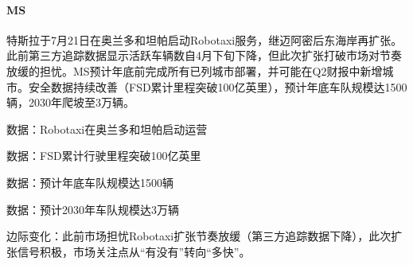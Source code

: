 \documentclass[11pt]{ctexart}
\begin{document}
\paragraph{MS} 特斯拉于7月21日在奥兰多和坦帕启动Robotaxi服务，继迈阿密后东海岸再扩张。此前第三方追踪数据显示活跃车辆数自4月下旬下降，但此次扩张打破市场对节奏放缓的担忧。MS预计年底前完成所有已列城市部署，并可能在Q2财报中新增城市。安全数据持续改善（FSD累计里程突破100亿英里），预计年底车队规模达1500辆，2030年爬坡至3万辆。
{\small\color{refgray}数据：Robotaxi在奥兰多和坦帕启动运营\par}
{\small\color{refgray}数据：FSD累计行驶里程突破100亿英里\par}
{\small\color{refgray}数据：预计年底车队规模达1500辆\par}
{\small\color{refgray}数据：预计2030年车队规模达3万辆\par}
{\small\color{refgray}边际变化：此前市场担忧Robotaxi扩张节奏放缓（第三方追踪数据下降），此次扩张信号积极，市场关注点从“有没有”转向“多快”。\par}
\end{document}
